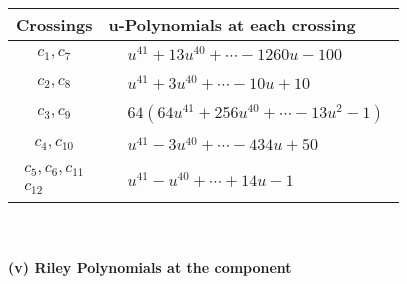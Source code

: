 \documentclass[1p]{elsarticle_modified}
\theoremstyle{definition}
\begin{document}
\begin{tabular}{m{50pt}|m{274pt}}
Crossings & \hspace{64pt}u-Polynomials at each crossing \\
\hline $$\begin{aligned}c_{1},c_{7}\end{aligned}$$&$\begin{aligned}
&u^{41}+13 u^{40}+\cdots-1260 u-100
\end{aligned}$\\
\hline $$\begin{aligned}c_{2},c_{8}\end{aligned}$$&$\begin{aligned}
&u^{41}+3 u^{40}+\cdots-10 u+10
\end{aligned}$\\
\hline $$\begin{aligned}c_{3},c_{9}\end{aligned}$$&$\begin{aligned}
&64(64 u^{41}+256 u^{40}+\cdots-13 u^2-1)
\end{aligned}$\\
\hline $$\begin{aligned}c_{4},c_{10}\end{aligned}$$&$\begin{aligned}
&u^{41}-3 u^{40}+\cdots-434 u+50
\end{aligned}$\\
\hline $$\begin{aligned}c_{5},c_{6},c_{11}\\c_{12}\end{aligned}$$&$\begin{aligned}
&u^{41}- u^{40}+\cdots+14 u-1
\end{aligned}$\\
\hline
\end{tabular}\\~\\
\newpage\renewcommand{\arraystretch}{1}
\flushleft \textbf{(v) Riley Polynomials at the component}\newline \\
\end{document}
